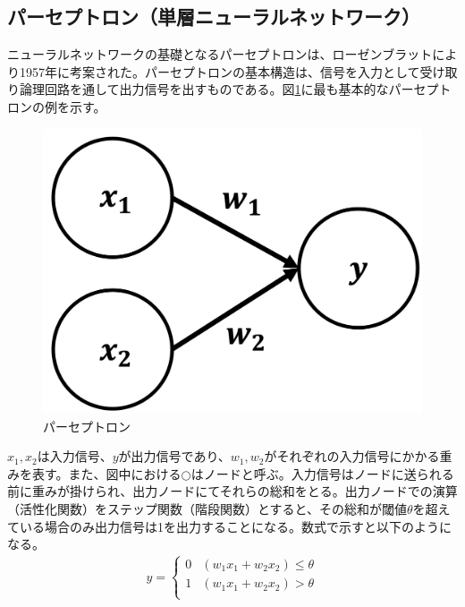 \subsection{パーセプトロン（単層ニューラルネットワーク）}
ニューラルネットワークの基礎となるパーセプトロンは、ローゼンブラットにより1957年に考案された。パーセプトロンの基本構造は、信号を入力として受け取り論理回路を通して出力信号を出すものである。図\ref{perceptron}に最も基本的なパーセプトロンの例を示す。\\
\begin{figure}[H]
	\begin{center}
 \includegraphics[keepaspectratio, scale=0.15]
 	{Figure/Deeplearning/perceptron.png}
 		\caption{パーセプトロン}
 		\label{perceptron}
	\end{center}
\end{figure}
$x_1, x_2$は入力信号、$y$が出力信号であり、$w_1,w_2$がそれぞれの入力信号にかかる重みを表す。また、図中における$\bigcirc$はノードと呼ぶ。入力信号はノードに送られる前に重みが掛けられ、出力ノードにてそれらの総和をとる。出力ノードでの演算（活性化関数）をステップ関数（階段関数）とすると、その総和が閾値$\theta$を超えている場合のみ出力信号は1を出力することになる。数式で示すと以下のようになる。\\
\begin{align}
 y =
 \begin{cases}
 0 & (w_1x_1 + w_2x_2 ) \leq \theta\\
 1 & (w_1x_1 + w_2x_2 ) > \theta \\
 \end{cases}
\end{align}
